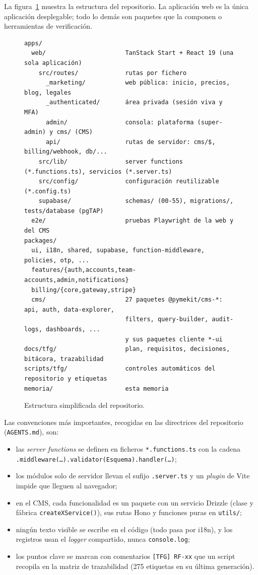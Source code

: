 La figura~\ref{fig:imp-arbol} muestra la estructura del repositorio. La
aplicación web es la única aplicación desplegable; todo lo demás son paquetes
que la componen o herramientas de verificación.

\begin{figure}[htbp]
  \centering
\begin{lstlisting}[style=pymekit, numbers=none, frame=none]
apps/
  web/                      TanStack Start + React 19 (una sola aplicación)
    src/routes/             rutas por fichero
      _marketing/           web pública: inicio, precios, blog, legales
      _authenticated/       área privada (sesión viva y MFA)
      admin/                consola: plataforma (super-admin) y cms/ (CMS)
      api/                  rutas de servidor: cms/$, billing/webhook, db/...
    src/lib/                server functions (*.functions.ts), servicios (*.server.ts)
    src/config/             configuración reutilizable (*.config.ts)
    supabase/               schemas/ (00-55), migrations/, tests/database (pgTAP)
  e2e/                      pruebas Playwright de la web y del CMS
packages/
  ui, i18n, shared, supabase, function-middleware, policies, otp, ...
  features/{auth,accounts,team-accounts,admin,notifications}
  billing/{core,gateway,stripe}
  cms/                      27 paquetes @pymekit/cms-*: api, auth, data-explorer,
                            filters, query-builder, audit-logs, dashboards, ...
                            y sus paquetes cliente *-ui
docs/tfg/                   plan, requisitos, decisiones, bitácora, trazabilidad
scripts/tfg/                controles automáticos del repositorio y etiquetas
memoria/                    esta memoria
\end{lstlisting}
  \caption{Estructura simplificada del repositorio.}
  \label{fig:imp-arbol}
\end{figure}

Las convenciones más importantes, recogidas en las directrices del
repositorio (\texttt{AGENTS.md}), son:

\begin{itemize}
  \item las \textit{server functions} se definen en ficheros
        \texttt{*.functions.ts} con la cadena
        \texttt{.middleware(\ldots).validator(Esquema).handler(\ldots)};
  \item los módulos solo de servidor llevan el sufijo \texttt{.server.ts} y
        un \textit{plugin} de Vite impide que lleguen al navegador;
  \item en el CMS, cada funcionalidad es un paquete con un servicio Drizzle
        (clase y fábrica \texttt{createXService()}), sus rutas Hono y
        funciones puras en \texttt{utils/};
  \item ningún texto visible se escribe en el código (todo pasa por i18n), y
        los registros usan el \textit{logger} compartido, nunca
        \texttt{console.log};
  \item los puntos clave se marcan con comentarios \texttt{[TFG] RF-xx} que
        un script recopila en la matriz de trazabilidad (275 etiquetas en su
        última generación).
\end{itemize}

